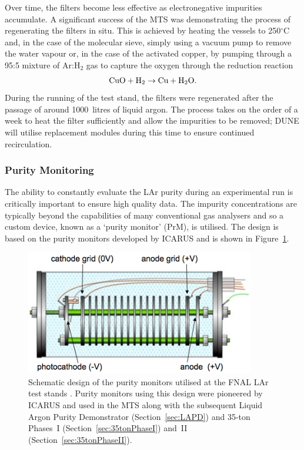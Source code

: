 Over time, the filters become less effective as electronegative impurities accumulate.  A significant success of the MTS was demonstrating the process of regenerating the filters in situ.  This is achieved by heating the vessels to 250$^{\circ}$C and, in the case of the molecular sieve, simply using a vacuum pump to remove the water vapour or, in the case of the activated copper, by pumping through a 95:5 mixture of Ar:H$_2$ gas to capture the oxygen through the reduction reaction
\begin{equation}
  \textnormal{CuO} + \textnormal{H}_2 \rightarrow \textnormal{Cu} + \textnormal{H}_2\textnormal{O}.
\end{equation}
During the running of the test stand, the filters were regenerated after the passage of around 1000~litres of liquid argon.  The process takes on the order of a week to heat the filter sufficiently and allow the impurities to be removed; DUNE will utilise replacement modules during this time to ensure continued recirculation.

\subsubsection{Purity Monitoring}\label{sec:PurityMonitoring}

The ability to constantly evaluate the LAr purity during an experimental run is critically important to ensure high quality data.  The impurity concentrations are typically beyond the capabilities of many conventional gas analysers and so a custom device, known as a `purity monitor' (PrM), is utilised.  The design is based on the purity monitors developed by ICARUS \cite{ICARUSPurityMonitor} and is shown in Figure~\ref{fig:PurityMonitor}.

\begin{figure}
  \centering
  \includegraphics[width=10cm]{PurityMonitor.png}
  \caption[Schematic design of the purity monitors utilised at the FNAL LAr test stands.]{Schematic design of the purity monitors utilised at the FNAL LAr test stands \cite{35tonPhaseI2014}.  Purity monitors using this design were pioneered by ICARUS \cite{ICARUSPurityMonitor} and used in the MTS along with the subsequent Liquid Argon Purity Demonstrator (Section~\ref{sec:LAPD}) and 35-ton Phases~I (Section~\ref{sec:35tonPhaseI}) and~II (Section~\ref{sec:35tonPhaseII}).}
  \label{fig:PurityMonitor}
\end{figure}

